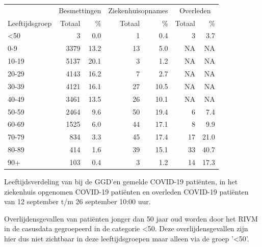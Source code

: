 \documentclass[
  english,
  man,floatsintext]{apa6}
\begin{document}
\begin{table}
\centering\begingroup\fontsize{11}{13}\selectfont

\begin{threeparttable}
\begin{tabular}{lrrrrrr}
\toprule
\multicolumn{1}{c}{ } & \multicolumn{2}{c}{Besmettingen} & \multicolumn{2}{c}{Ziekenhuisopnames} & \multicolumn{2}{c}{Overleden} \\
\cmidrule(l{3pt}r{3pt}){2-3} \cmidrule(l{3pt}r{3pt}){4-5} \cmidrule(l{3pt}r{3pt}){6-7}
Leeftijdsgroep & Totaal & \% & Totaal & \% & Totaal & \%\\
\midrule
<50 & 3 & 0.0 & 1 & 0.4 & 3 & 3.7\\
0-9 & 3379 & 13.2 & 13 & 5.0 & NA & NA\\
10-19 & 5137 & 20.1 & 3 & 1.2 & NA & NA\\
20-29 & 4143 & 16.2 & 7 & 2.7 & NA & NA\\
30-39 & 4121 & 16.1 & 27 & 10.5 & NA & NA\\
40-49 & 3461 & 13.5 & 26 & 10.1 & NA & NA\\
50-59 & 2464 & 9.6 & 50 & 19.4 & 6 & 7.4\\
60-69 & 1525 & 6.0 & 44 & 17.1 & 8 & 9.9\\
70-79 & 834 & 3.3 & 45 & 17.4 & 17 & 21.0\\
80-89 & 414 & 1.6 & 39 & 15.1 & 33 & 40.7\\
90+ & 103 & 0.4 & 3 & 1.2 & 14 & 17.3\\
\bottomrule
\end{tabular}
\begin{tablenotes}
\item[1] Leeftijdsverdeling van bij de GGD’en gemelde COVID-19 patiënten, in het ziekenhuis opgenomen COVID-19 patiënten en overleden COVID-19 patiënten van 12 september t/m 26 september 10:00 uur.
\item[2] Overlijdensgevallen van patiënten jonger dan 50 jaar oud worden door het RIVM in de casusdata gegroepeerd in de categorie <50. Deze overlijdensgevallen zijn hier dus niet zichtbaar in deze leeftijdsgroepen maar alleen via de groep '<50'.
\end{tablenotes}
\end{threeparttable}
\endgroup{}
\end{table}

\newpage
\end{document}
